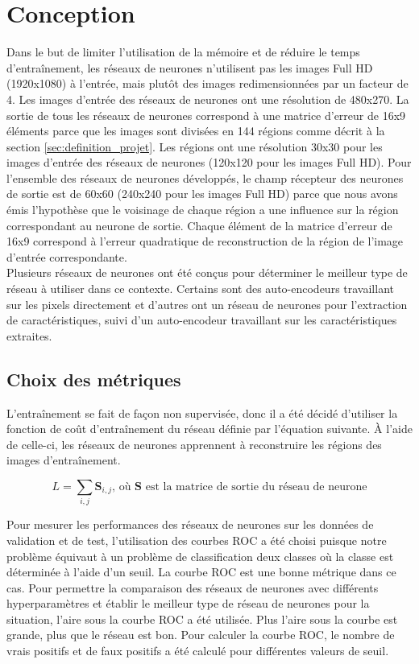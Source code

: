 \section{Conception}
    Dans le but de limiter l'utilisation de la mémoire et de réduire le temps d'entraînement, les réseaux de neurones n'utilisent pas les images Full HD (1920x1080) à l'entrée, mais plutôt des images redimensionnées par un facteur de 4. Les images d'entrée des réseaux de neurones ont une résolution de 480x270. La sortie de tous les réseaux de neurones correspond à une matrice d'erreur de 16x9 éléments parce que les images sont divisées en 144 régions comme décrit à la section \ref{sec:definition_projet}. Les régions ont une résolution 30x30 pour les images d'entrée des réseaux de neurones (120x120 pour les images Full HD). Pour l'ensemble des réseaux de neurones développés, le champ récepteur des neurones de sortie est de 60x60 (240x240 pour les images Full HD) parce que nous avons émis l'hypothèse que le voisinage de chaque région a une influence sur la région correspondant au neurone de sortie. Chaque élément de la matrice d'erreur de 16x9 correspond à l'erreur quadratique de reconstruction de la région de l'image d'entrée correspondante.\\
    
    Plusieurs réseaux de neurones ont été conçus pour déterminer le meilleur type de réseau à utiliser dans ce contexte. Certains sont des auto-encodeurs travaillant sur les pixels directement et d'autres ont un réseau de neurones pour l'extraction de caractéristiques, suivi d'un auto-encodeur travaillant sur les caractéristiques extraites. 

\subsection{Choix des métriques}
    L'entraînement se fait de façon non supervisée, donc il  a été décidé d'utiliser la fonction de coût d'entraînement du réseau définie par l'équation suivante. À l'aide de celle-ci, les réseaux de neurones apprennent à reconstruire les régions des images d'entraînement.
    
    \begin{equation}
        L = \sum_{i,j} \mathbf{S}_{i,j} \text{, où } \mathbf{S} \text{ est la matrice de sortie du réseau de neurone}
    \end{equation}
    
    Pour mesurer les performances des réseaux de neurones sur les données de validation et de test, l'utilisation des courbes ROC a été choisi puisque notre problème équivaut à un problème de classification deux classes où la classe est déterminée à l'aide d'un seuil. La courbe ROC est une bonne métrique dans ce cas. Pour permettre la comparaison des réseaux de neurones avec différents hyperparamètres et établir le meilleur type de réseau de neurones pour la situation, l'aire sous la courbe ROC a été utilisée. Plus l'aire sous la courbe est grande, plus que le réseau est bon. Pour calculer la courbe ROC, le nombre de vrais positifs et de faux positifs a été calculé pour différentes valeurs de seuil.

